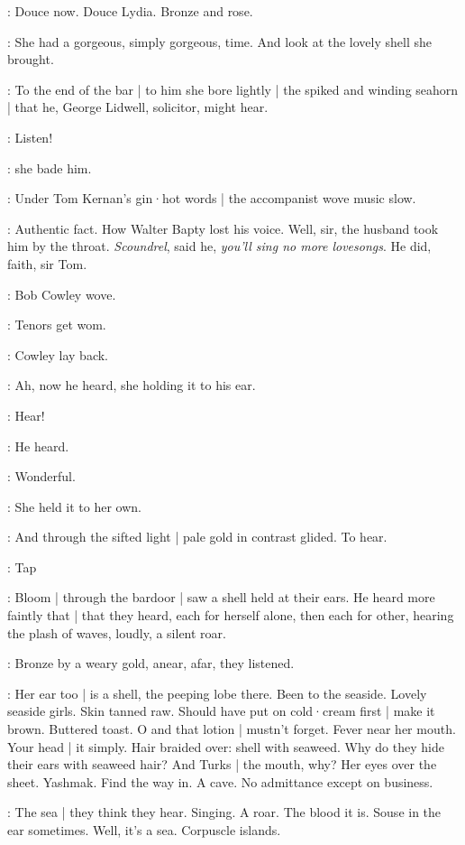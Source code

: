 :
Douce now.
Douce Lydia.
Bronze and rose.

:
She had a gorgeous,
simply gorgeous,
time.
And look at the lovely shell she brought.

:
To the end of the bar |
to him she bore lightly |
the spiked and winding seahorn |
that he,
George Lidwell,
solicitor,
might hear.

\MissD:
Listen!

:
she bade him.

:
Under Tom Kernan's gin·hot words |
the accompanist wove music slow.

:
Authentic fact.
How Walter Bapty lost his voice.
Well, sir,
the husband took him by the throat.
\emph{Scoundrel},
said he,
\emph{you'll sing no more lovesongs}.
He did,
faith,
sir Tom.

:
Bob Cowley wove.

\BloomInt:
Tenors get wom.

:
Cowley lay back.

:
Ah,
now he heard,
she holding it to his ear.

\MissD:
Hear!

:
He heard.

\lidwell:
Wonderful.

:
She held it to her own.

:
And through the sifted light |
pale gold in contrast glided.
To hear.

\stripling:
Tap

:
Bloom |
through the bardoor |
saw a shell held at their ears.
He heard more faintly that |
that they heard,
each for herself alone,
then each for other,
hearing the plash of waves,
loudly,
a silent roar.

:
Bronze by a weary gold,
anear,
afar,
they listened.

\BloomInt:
Her ear too |
is a shell,
the peeping lobe there.
Been to the seaside.
Lovely seaside girls.
Skin tanned raw.
Should have put on cold·cream first |
make it brown.
Buttered toast.
O and that lotion |
mustn't forget.
Fever near her mouth.
Your head |
it simply.
Hair braided over:
shell with seaweed.
Why do they hide their ears with seaweed hair?
And Turks |
the mouth,
why?
Her eyes over the sheet.
Yashmak.
Find the way in.
A cave.
No admittance except on business.

\BloomInt:
The sea |
they think they hear.
Singing.
A roar.
The blood it is.
Souse
in the ear sometimes.
Well,
it's a sea.
Corpuscle islands.

